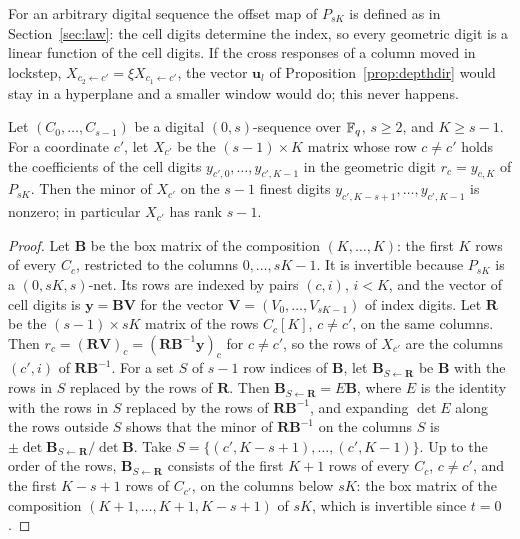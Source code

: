 For an arbitrary digital sequence the offset map of $P_{sK}$ is defined as in Section~\ref{sec:law}: the cell digits determine the index, so every geometric digit is a linear function of the cell digits. If the cross responses of a column moved in lockstep, $X_{c_2\leftarrow c'}=\xi X_{c_1\leftarrow c'}$, the vector $\mathbf u_l$ of Proposition~\ref{prop:depthdir} would stay in a hyperplane and a smaller window would do; this never happens.

\begin{proposition}\label{prop:rank2}
Let $(C_0,\dots,C_{s-1})$ be a digital $(0,s)$-sequence over $\mathbb{F}_q$, $s\ge2$, and $K\ge s-1$. For a coordinate $c'$, let $X_{c'}$ be the $(s-1)\times K$ matrix whose row $c\ne c'$ holds the coefficients of the cell digits $y_{c',0},\dots,y_{c',K-1}$ in the geometric digit $r_c=y_{c,K}$ of $P_{sK}$. Then the minor of $X_{c'}$ on the $s-1$ finest digits $y_{c',K-s+1},\dots,y_{c',K-1}$ is nonzero; in particular $X_{c'}$ has rank $s-1$.
\end{proposition}

\begin{proof}
Let $\mathbf B$ be the box matrix of the composition $(K,\dots,K)$: the first $K$ rows of every $C_c$, restricted to the columns $0,\dots,sK-1$. It is invertible because $P_{sK}$ is a $(0,sK,s)$-net. Its rows are indexed by pairs $(c,i)$, $i<K$, and the vector of cell digits is $\mathbf y=\mathbf B\mathbf V$ for the vector $\mathbf V=(V_0,\dots,V_{sK-1})$ of index digits. Let $\mathbf R$ be the $(s-1)\times sK$ matrix of the rows $C_c[K]$, $c\ne c'$, on the same columns. Then $r_c=(\mathbf R\mathbf V)_c=(\mathbf R\mathbf B^{-1}\mathbf y)_c$ for $c\ne c'$, so the rows of $X_{c'}$ are the columns $(c',i)$ of $\mathbf R\mathbf B^{-1}$.
For a set $S$ of $s-1$ row indices of $\mathbf B$, let $\mathbf B_{S\leftarrow\mathbf R}$ be $\mathbf B$ with the rows in $S$ replaced by the rows of $\mathbf R$. Then $\mathbf B_{S\leftarrow\mathbf R}=E\mathbf B$, where $E$ is the identity with the rows in $S$ replaced by the rows of $\mathbf R\mathbf B^{-1}$, and expanding $\det E$ along the rows outside $S$ shows that the minor of $\mathbf R\mathbf B^{-1}$ on the columns $S$ is $\pm\det\mathbf B_{S\leftarrow\mathbf R}/\det\mathbf B$. Take $S=\{(c',K-s+1),\dots,(c',K-1)\}$. Up to the order of the rows, $\mathbf B_{S\leftarrow\mathbf R}$ consists of the first $K+1$ rows of every $C_c$, $c\ne c'$, and the first $K-s+1$ rows of $C_{c'}$, on the columns below $sK$: the box matrix of the composition $(K+1,\dots,K+1,K-s+1)$ of $sK$, which is invertible since $t=0$.
\end{proof}

